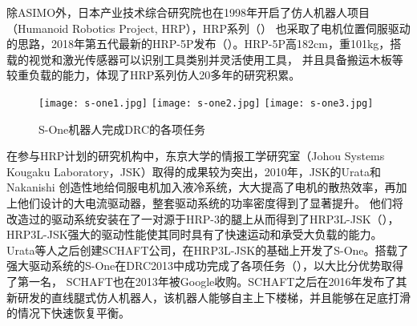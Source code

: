 除ASIMO外，日本产业技术综合研究院也在1998年开启了仿人机器人项目（Humanoid Robotics Project, HRP），HRP系列（）
也采取了电机位置伺服驱动的思路，2018年第五代最新的HRP-5P发布（）。HRP-5P高182cm，重101kg，搭载的视觉和激光传感器可以识别工具类别并灵活使用工具，
并且具备搬运木板等较重负载的能力\cite{HRP}，体现了HRP系列仿人20多年的研究积累。
\begin{figure}[htbp]
    \centering
    \texttt{[image: s-one1.jpg]}
    \texttt{[image: s-one2.jpg]}
    \texttt{[image: s-one3.jpg]}
    \caption{\label{fig:s-one}S-One机器人完成DRC的各项任务}
\end{figure}
在参与HRP计划的研究机构中，东京大学的情报工学研究室（Johou Systems Kougaku Laboratory，JSK）取得的成果较为突出，2010年，JSK的Urata和Nakanishi
创造性地给伺服电机加入液冷系统，大大提高了电机的散热效率，再加上他们设计的大电流驱动器，整套驱动系统的功率密度得到了显著提升。
他们将改造过的驱动系统安装在了一对源于HRP-3的腿上从而得到了HRP3L-JSK（），HRP3L-JSK强大的驱动性能使其同时具有了快速运动和承受大负载的能力。
Urata等人之后创建SCHAFT公司，在HRP3L-JSK的基础上开发了S-One。搭载了强大驱动系统的S-One在DRC2013中成功完成了各项任务（），以大比分优势取得了第一名，
SCHAFT也在2013年被Google收购。SCHAFT之后在2016年发布了其新研发的直线腿式仿人机器人，该机器人能够自主上下楼梯，并且能够在足底打滑的情况下快速恢复平衡\cite{SCHAFT}。
